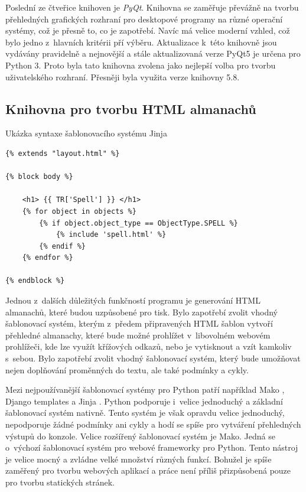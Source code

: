\documentclass[thesis=B,czech]{resources/FITthesis}[2012/06/26]
\begin{document}
Poslední ze čtveřice knihoven je \textit{PyQt}. Knihovna se zaměřuje převážně na tvorbu přehledných grafických rozhraní pro desktopové programy na různé operační systémy, což je přesně to, co je zapotřebí. Navíc má velice moderní vzhled, což bylo jedno z~hlavních kritérii pří výběru. Aktualizace k~této knihovně jsou vydávány pravidelně a nejnovější a stále aktualizovaná verze PyQt5 je určena pro Python 3. Proto byla tato knihovna zvolena jako nejlepší volba pro tvorbu uživatelského rozhraní. Přesněji byla využita verze knihovny 5.8.
\subsection{Knihovna pro tvorbu HTML almanachů}
\begin{listing}[htbp]
\caption{\label{code:jinja}Ukázka syntaxe šablonovacího systému Jinja}
\begin{verbatim}
{% extends "layout.html" %}

{% block body %}

    <h1> {{ TR['Spell'] }} </h1>
    {% for object in objects %}
        {% if object.object_type == ObjectType.SPELL %}
            {% include 'spell.html' %}
        {% endif %}
    {% endfor %}
    
{% endblock %}

\end{verbatim}
\end{listing}
Jednou z~dalších důležitých funkčností programu je generování HTML almanachů, které budou uzpůsobené pro tisk. Bylo zapotřebí zvolit vhodný šablonovací systém, kterým z~předem připravených HTML šablon vytvoří přehledné almanachy, které bude možné prohlížet v~libovolném webovém prohlížeči, kde lze využít křížových odkazů, nebo je vytisknout a vzít kamkoliv s~sebou. Bylo zapotřebí zvolit vhodný šablonovací systém, který bude umožňovat nejen doplňování proměnných do textu, ale také podmínky a cykly.\par

Mezi nejpoužívanější šablonovací systémy pro Python patří například Mako \cite{mako}, Django templates a Jinja \cite{jinja}. Python podporuje i~velice jednoduchý a základní šablonovací systém nativně. Tento systém je však opravdu velice jednoduchý, nepodporuje žádné podmínky ani cykly a hodí se spíše pro vytváření přehledných výstupů do konzole. Velice rozšířený šablonovací systém je Mako. Jedná se o~výchozí šablonovací systém pro webové frameworky pro Python. Tento nástroj je velice mocný a zvládne velké množství různých funkcí. Bohužel je spíše zaměřený pro tvorbu webových aplikací a práce není příliš přizpůsobená pouze pro tvorbu statických stránek.\par
\end{document}
